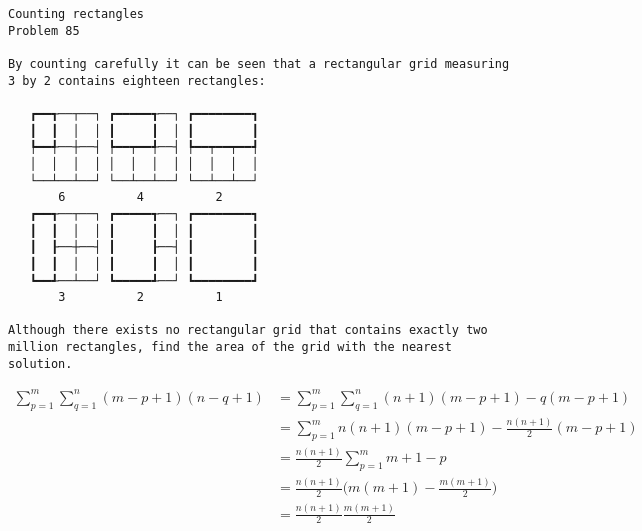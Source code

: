 \documentclass{article}
\begin{document}
% 

\begin{verbatim}
Counting rectangles
Problem 85

By counting carefully it can be seen that a rectangular grid measuring
3 by 2 contains eighteen rectangles:

   ┏━━┱──┬──┐ ┏━━━━━┱──┐ ┏━━━━━━━━┓
   ┃  ┃  │  │ ┃     ┃  │ ┃        ┃
   ┡━━╃──┼──┤ ┡━━┯━━╃──┤ ┡━━┯━━┯━━┩
   │  │  │  │ │  │  │  │ │  │  │  │
   └──┴──┴──┘ └──┴──┴──┘ └──┴──┴──┘
       6          4          2
   ┏━━┱──┬──┐ ┏━━━━━┱──┐ ┏━━━━━━━━┓
   ┃  ┃  │  │ ┃     ┃  │ ┃        ┃
   ┃  ┠──┼──┤ ┃     ┠──┤ ┃        ┃
   ┃  ┃  │  │ ┃     ┃  │ ┃        ┃
   ┗━━┹──┴──┘ ┗━━━━━┹──┘ ┗━━━━━━━━┛
       3          2          1

Although there exists no rectangular grid that contains exactly two
million rectangles, find the area of the grid with the nearest
solution.
\end{verbatim}

\begin{align*}
  \sum_{p=1}^m \sum_{q=1}^n (m - p + 1) (n - q + 1)
    & = \sum_{p=1}^m \sum_{q=1}^n (n + 1)(m - p + 1) - q(m - p + 1) \\
    & = \sum_{p=1}^m n(n + 1)(m - p + 1) - \frac{n(n + 1)}{2}(m - p + 1) \\
    & = \frac{n(n + 1)}{2} \sum_{p=1}^m m + 1 - p \\
    & = \frac{n(n + 1)}{2} \bigg( m(m + 1) - \frac{m(m + 1)}{2} \bigg) \\
    & = \frac{n(n + 1)}{2} \frac{m(m + 1)}{2}
  \\
\end{align*}
\end{document}
